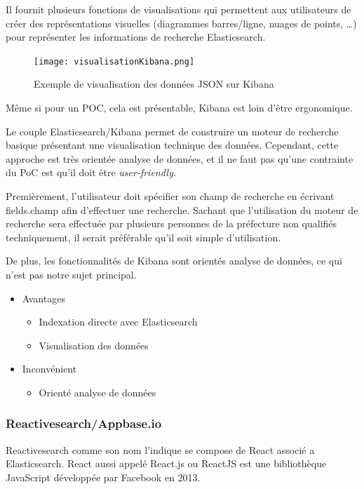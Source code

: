 Il fournit plusieurs fonctions de visualisations qui permettent aux utilisateurs de créer des représentations visuelles (diagrammes barres/ligne, nuages de points, \ldots) pour représenter les informations de recherche Elasticsearch.

\begin{figure}[h!]
  \centering
  \texttt{[image: visualisationKibana.png]}
	\caption[]{Exemple de visualisation des données JSON sur Kibana}
	\label{}
\end{figure}
Même si pour un POC, cela est présentable, Kibana est loin d’être ergonomique.

Le couple Elasticsearch/Kibana permet de construire un moteur de recherche basique présentant une visualisation technique des données.
Cependant, cette approche est très orientée analyse de données, et il ne faut pas qu'une contrainte du PoC est qu'il doit être \textit{user-friendly}.

Premièrement, l’utilisateur doit spécifier son champ de recherche en écrivant fields.champ afin d’effectuer une recherche.
Sachant que l’utilisation du moteur de recherche sera effectuée par plusieurs personnes de la préfecture non qualifiés techniquement, il serait préférable qu'il soit simple d’utilisation.

De plus, les fonctionnalités de Kibana sont orientés analyse de données, ce qui n'est pas notre sujet principal.

\begin{itemize}
    \item Avantages 
        \begin{itemize}
            \item Indexation directe avec Elasticsearch
            \item Visualisation des données
        \end{itemize}
    \item Inconvénient 
        \begin{itemize}
        \item Orienté analyse de données
        \end{itemize}
\end{itemize}


\subsubsection{Reactivesearch/Appbase.io}
Reactivesearch comme son nom l’indique se compose de React associé a Elasticsearch.
React aussi appelé React.js ou ReactJS est une bibliothèque JavaScript développée par Facebook en 2013.

